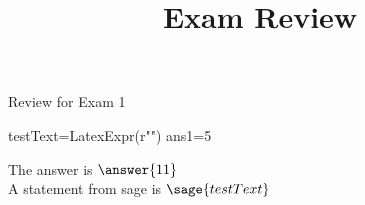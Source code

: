 \documentclass{ximera}
\title{Exam Review}
\begin{document}
\maketitle
Review for Exam 1

\begin{sagesilent}
    testText=LatexExpr(r"")
    ans1=5
\end{sagesilent}

\begin{problem}
The answer is $\answer{11}$\\
A statement from sage is $\sage{testText}$
\end{problem}
\end{document}
